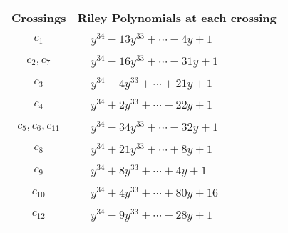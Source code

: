 \documentclass[1p]{elsarticle_modified}
\theoremstyle{definition}
\begin{document}
\begin{tabular}{m{50pt}|m{274pt}}
Crossings & \hspace{64pt}Riley Polynomials at each crossing \\
\hline $$\begin{aligned}c_{1}\end{aligned}$$&$\begin{aligned}
&y^{34}-13 y^{33}+\cdots-4 y+1
\end{aligned}$\\
\hline $$\begin{aligned}c_{2},c_{7}\end{aligned}$$&$\begin{aligned}
&y^{34}-16 y^{33}+\cdots-31 y+1
\end{aligned}$\\
\hline $$\begin{aligned}c_{3}\end{aligned}$$&$\begin{aligned}
&y^{34}-4 y^{33}+\cdots+21 y+1
\end{aligned}$\\
\hline $$\begin{aligned}c_{4}\end{aligned}$$&$\begin{aligned}
&y^{34}+2 y^{33}+\cdots-22 y+1
\end{aligned}$\\
\hline $$\begin{aligned}c_{5},c_{6},c_{11}\end{aligned}$$&$\begin{aligned}
&y^{34}-34 y^{33}+\cdots-32 y+1
\end{aligned}$\\
\hline $$\begin{aligned}c_{8}\end{aligned}$$&$\begin{aligned}
&y^{34}+21 y^{33}+\cdots+8 y+1
\end{aligned}$\\
\hline $$\begin{aligned}c_{9}\end{aligned}$$&$\begin{aligned}
&y^{34}+8 y^{33}+\cdots+4 y+1
\end{aligned}$\\
\hline $$\begin{aligned}c_{10}\end{aligned}$$&$\begin{aligned}
&y^{34}+4 y^{33}+\cdots+80 y+16
\end{aligned}$\\
\hline $$\begin{aligned}c_{12}\end{aligned}$$&$\begin{aligned}
&y^{34}-9 y^{33}+\cdots-28 y+1
\end{aligned}$\\
\hline
\end{tabular}\\~\\
\end{document}
